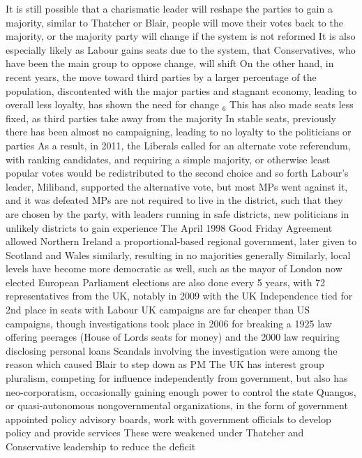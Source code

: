 \documentclass[11 pt, twoside]{article}
\newcommand{\foot}[1]{\hyperlink{#1}{$_#1$}}
\newenvironment{outline*}
{
	\begin{outline}[enumerate]
	}
	{\end{outline}
}
\begin{document}
\begin{outline*}
\4 It is still possible that a charismatic leader will reshape the parties to gain a majority, similar to Thatcher or Blair, people will move their votes back to the majority, or the majority party will change if the system is not reformed
\4 It is also especially likely as Labour gains seats due to the system, that Conservatives, who have been the main group to oppose change, will shift
\3 On the other hand, in recent years, the move toward third parties by a larger percentage of the population, discontented with the major parties and stagnant economy, leading to overall less loyalty, has shown the need for change \foot{6}
\4 This has also made seats less fixed, as third parties take away from the majority
\4 In stable seats, previously there has been almost no campaigning, leading to no loyalty to the politicians or parties
\3 As a result, in 2011, the Liberals called for an alternate vote referendum, with ranking candidates, and requiring a simple majority, or otherwise least popular votes would be redistributed to the second choice and so forth
\4 Labour's leader, Miliband, supported the alternative vote, but most MPs went against it, and it was defeated
\2 MPs are not required to live in the district, such that they are chosen by the party, with leaders running in safe districts, new politicians in unlikely districts to gain experience
\2 The April 1998 Good Friday Agreement allowed Northern Ireland a proportional-based regional government, later given to Scotland and Wales similarly, resulting in no majorities generally
\3 Similarly, local levels have become more democratic as well, such as the mayor of London now elected
\2 European Parliament elections are also done every 5 years, with 72 representatives from the UK, notably in 2009 with the UK Independence tied for 2nd place in seats with Labour
\2 UK campaigns are far cheaper than US campaigns, though investigations took place in 2006 for breaking a 1925 law offering peerages (House of Lords seats for money) and the 2000 law requiring disclosing personal loans
\3 Scandals involving the investigation were among the reason which caused Blair to step down as PM
\1 The UK has interest group pluralism, competing for influence independently from government, but also has neo-corporatism, occasionally gaining enough power to control the state
\2 Quangos, or quasi-autonomous nongovernmental organizations, in the form of government appointed policy advisory boards, work with government officials to develop policy and provide services
\3 These were weakened under Thatcher and Conservative leadership to reduce the deficit

\end{outline*}
\end{document}
